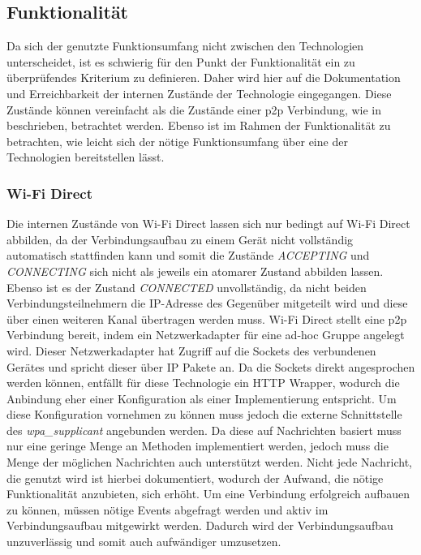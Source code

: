 		\subsection{Funktionalität}
      Da sich der genutzte Funktionsumfang nicht zwischen den Technologien unterscheidet, ist es schwierig für den Punkt der Funktionalität ein zu überprüfendes Kriterium zu definieren. Daher wird hier auf die Dokumentation und Erreichbarkeit der internen Zustände der Technologie eingegangen. Diese Zustände können vereinfacht als die Zustände einer p2p Verbindung, wie in  beschrieben, betrachtet werden. Ebenso ist im Rahmen der Funktionalität zu betrachten, wie leicht sich der nötige Funktionsumfang über eine der Technologien bereitstellen lässt.
      
		\subsubsection{Wi-Fi Direct} Die internen Zustände von Wi-Fi Direct lassen sich nur bedingt auf Wi-Fi Direct abbilden, da der Verbindungsaufbau zu einem Gerät nicht vollständig automatisch stattfinden kann und somit die Zustände {\it ACCEPTING} und {\it CONNECTING} sich nicht als jeweils ein atomarer Zustand abbilden lassen. Ebenso ist es der Zustand {\it CONNECTED} unvollständig, da nicht beiden Verbindungsteilnehmern die IP-Adresse des Gegenüber mitgeteilt wird und diese über einen weiteren Kanal übertragen werden muss.
		Wi-Fi Direct stellt eine p2p Verbindung bereit, indem ein Netzwerkadapter für eine ad-hoc Gruppe angelegt wird. Dieser Netzwerkadapter hat Zugriff auf die Sockets des verbundenen Gerätes und spricht dieser über IP Pakete an. Da die Sockets direkt angesprochen werden können, entfällt für diese Technologie ein HTTP Wrapper, wodurch die Anbindung eher einer Konfiguration als einer Implementierung entspricht. Um diese Konfiguration vornehmen zu können muss jedoch die externe Schnittstelle des {\it wpa\_supplicant} angebunden werden. Da diese auf Nachrichten basiert muss nur eine geringe Menge an Methoden implementiert werden, jedoch muss die Menge der möglichen Nachrichten auch unterstützt werden. Nicht jede Nachricht, die genutzt wird ist hierbei dokumentiert, wodurch der Aufwand, die nötige Funktionalität anzubieten, sich erhöht. Um eine Verbindung erfolgreich aufbauen zu können, müssen nötige Events abgefragt werden und aktiv im Verbindungsaufbau mitgewirkt werden. Dadurch wird der Verbindungsaufbau unzuverlässig und somit auch aufwändiger umzusetzen.
		
